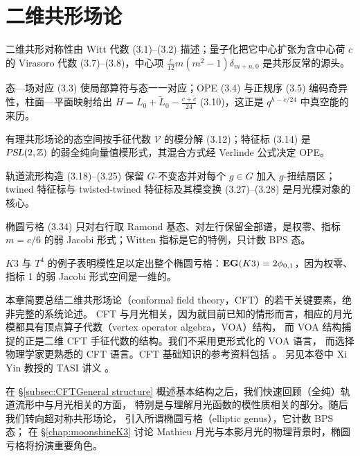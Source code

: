 \section{二维共形场论}
\label{sec:CFT}

\begin{keytakeaways}
  \item 二维共形对称性由 Witt 代数 (3.1)--(3.2) 描述；量子化把它中心扩张为含中心荷 $c$ 的 Virasoro 代数 (3.7)--(3.8)，中心项 $\frac{c}{12}m(m^2-1)\delta_{m+n,0}$ 是共形反常的源头。
  \item 态—场对应 (3.3) 使局部算符与态一一对应；OPE (3.4) 与正规序 (3.5) 编码奇异性，柱面—平面映射给出 $H=L_0+\tilde L_0-\frac{c+\tilde c}{24}$ (3.10)，这正是 $q^{h-c/24}$ 中真空能的来历。
  \item 有理共形场论的态空间按手征代数 $\mathcal{V}$ 的模分解 (3.12)；特征标 (3.14) 是 $\operatorname{\textsl{PSL}}(2,\mathbb{Z})$ 的弱全纯向量值模形式，其混合方式经 Verlinde 公式决定 OPE。
  \item 轨道流形构造 (3.18)--(3.25) 保留 $G$-不变态并对每个 $g\in G$ 加入 $g$-扭结扇区；twined 特征标与 twisted-twined 特征标及其模变换 (3.27)--(3.28) 是月光模对象的核心。
  \item 椭圆亏格 (3.34) 只对右行取 Ramond 基态、对左行保留全部谱，是权零、指标 $m=c/6$ 的弱 Jacobi 形式；Witten 指标是它的特例，只计数 BPS 态。
  \item $K3$ 与 $T^4$ 的例子表明模性足以定出整个椭圆亏格：${\bf EG}(K3)=2\phi_{0,1}$，因为权零、指标 1 的弱 Jacobi 形式空间是一维的。
\end{keytakeaways}

本章简要总结二维共形场论（conformal field theory，CFT）的若干关键要素，绝非完整的系统论述。
CFT 与月光相关，因为就目前已知的情形而言，相应的月光模都具有顶点算子代数（vertex operator algebra，VOA）结构，
而 VOA 结构捕捉的正是二维 CFT 手征代数的结构。我们不采用更形式化的 VOA 语言，
而选择物理学家更熟悉的 CFT 语言。CFT 基础知识的参考资料包括
\cite{DiFrancescoPhilippe1997Cft/,BlumenhagenRalph2009ItCF,MR2201600,MatthiasRGaberdiel2000Aitc}。
另见本卷中 Xi Yin 教授的 TASI 讲义 \cite{xi_yin_tasi17}。

在 \S\ref{subsec:CFTGeneral structure} 概述基本结构之后，我们快速回顾（全纯）轨道流形中与月光相关的方面，
特别是与理解月光函数的模性质相关的部分。随后我们转向超对称共形场论，
引入所谓椭圆亏格（elliptic genus），它计数 BPS 态；
在 \S\ref{chap:moonshineK3} 讨论 Mathieu 月光与本影月光的物理背景时，椭圆亏格将扮演重要角色。

